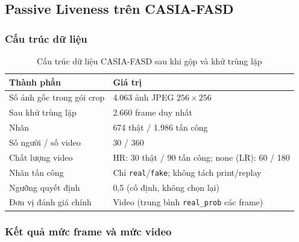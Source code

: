 \documentclass[12pt,a4paper]{article}
\begin{document}
\subsection{Passive Liveness trên CASIA-FASD}
\subsubsection{Cấu trúc dữ liệu}
\begin{table}[H]
  \centering
  \caption{Cấu trúc dữ liệu CASIA-FASD sau khi gộp và khử trùng lặp}
  \label{tab:casia-composition}
  \small
  \begin{tabular}{@{}ll@{}}
    \toprule
    \textbf{Thành phần} & \textbf{Giá trị}\\
    \midrule
    Số ảnh gốc trong gói crop & 4.063 ảnh JPEG $256\times256$\\
    Sau khử trùng lặp & 2.660 frame duy nhất\\
    Nhãn & 674 thật / 1.986 tấn công\\
    Số người / số video & 30 / 360\\
    Chất lượng video & HR: 30 thật / 90 tấn công; none (LR): 60 / 180\\
    Nhãn tấn công & Chỉ \texttt{real}/\texttt{fake}; không tách print/replay\\
    Ngưỡng quyết định & 0,5 (cố định, không chọn lại)\\
    Đơn vị đánh giá chính & Video (trung bình \texttt{real\_prob} các frame)\\
    \bottomrule
  \end{tabular}
\end{table}

\subsubsection{Kết quả mức frame và mức video}
\begin{table}[H]
  \centering
  \caption{Kết quả passive liveness (MiniFASNetV2) trên CASIA-FASD, TTA bật, ngưỡng 0,5}
  \label{tab:fas-casia}
  \footnotesize
\end{table}
\end{document}
